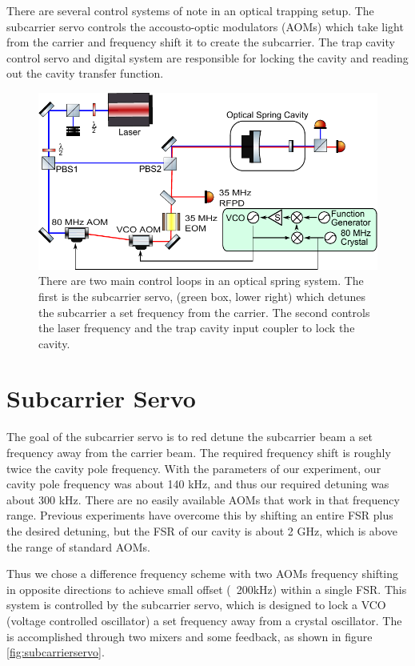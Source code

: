 There are several control systems of note in an optical trapping setup. The subcarrier servo controls the accousto-optic modulators (AOMs) which take light from the carrier and frequency shift it to create the subcarrier. The trap cavity control servo and digital system are responsible for locking the cavity and reading out the cavity transfer function.

\begin{figure}[htbp]%
\centering
\includegraphics[width=.8\textwidth]{figures/photothermal/layout3}%
\caption[Simplified optical spring layout]{There are two main control loops in an optical spring system. The first is the subcarrier servo, (green box, lower right) which detunes the subcarrier a set frequency from the carrier. The second controls the laser frequency and the trap cavity input coupler to lock the cavity.}%
\label{fig:controlLoopsSimple}%
\end{figure}

\section{Subcarrier Servo}
The goal of the subcarrier servo is to red detune the subcarrier beam a set frequency away from the carrier beam. 
The required frequency shift is roughly twice the cavity pole frequency. 
With the parameters of our experiment, our cavity pole frequency was about 140 kHz, and thus our required detuning was about 300 kHz. 
There are no easily available AOMs that work in that frequency range. 
Previous experiments \cite{Corbitt07} have overcome this by shifting an entire FSR plus the desired detuning, but the FSR of our cavity is about 2 GHz, which is above the range of standard AOMs. 

Thus we chose a difference frequency scheme with two AOMs frequency shifting in opposite directions to achieve small offset (~200kHz) within a single FSR.
This system is controlled by the subcarrier servo, which is designed to lock a VCO (voltage controlled oscillator) a set frequency away from a crystal oscillator. The is accomplished through two mixers and some feedback, as shown in figure \ref{fig:subcarrierservo}.

